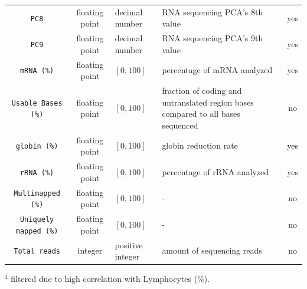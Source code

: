 \begin{table}[!ht]
\begin{threeparttable}
\begin{tabular}{c | c p{3cm} p{4cm} c}
        \texttt{PC8} 
            & floating point & decimal number & RNA sequencing PCA's 8th value & yes \\ 
        \texttt{PC9} 
            & floating point & decimal number & RNA sequencing PCA's 9th value & yes \\ 
        \texttt{mRNA (\%)}
            & floating point & $[0, 100]$ & percentage of mRNA analyzed & yes \\
        \texttt{Usable Bases (\%)}
            & floating point & $[0, 100]$ & fraction of coding and untranslated region bases compared to all bases
sequenced & no \\
        \texttt{globin (\%)}
            & floating point & $[0, 100]$ & globin reduction rate & yes \\
        \texttt{rRNA (\%)}
            & floating point & $[0, 100]$ & percentage of rRNA analyzed & yes \\
        \texttt{Multimapped (\%)}
            & floating point & $[0, 100]$ & - & no \\
        \texttt{Uniquely mapped (\%)}
            & floating point & $[0, 100]$ & - & no \\
        \texttt{Total reads}
            & integer & positive integer & amount of sequencing reads & no \\
        \bottomrule 
    \end{tabular}
    \begin{tablenotes}
        \item $^4$ filtered due to high correlation with Lymphocytes (\%).
    \end{tablenotes}
    \end{threeparttable}
\end{table}

